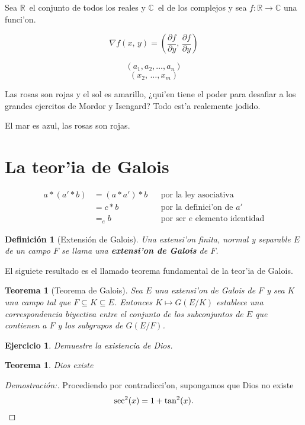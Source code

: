 \documentclass[11pt,titlepage]{article}
\newcommand{\tto}{\longrightarrow}
\newcommand{\R}{{\ensuremath{\mathbb{R}}}}
\newcommand{\C}{{\ensuremath{\mathbb{C}}}}
\newcommand{\parcial}[2]{\frac{\partial #1}{\partial #2}}
\newcommand{\upla}[2]{(#1_1,#1_2,\ldots,#1_{#2})}
\newcommand{\kupla}[3][k]{(#2_{#3},\,\ldots,#2_{#1})}
\theoremstyle{plain}
\newtheorem{teor}[prop]{Teorema}
\theoremstyle{defintion}
\newtheorem{defi}{Definici\'{o}n}[section]
\newtheorem{ejer}{Ejercicio}[section]
\theoremstyle{remark}
\begin{document}
Sea \R\ el conjunto de todos los reales y \C\ el de los complejos y sea $f:\R\tto\C$ una funci'on.

\[
\nabla f(x,\,y)=\left(\parcial{f}{y},\,\parcial{f}{y}\right)
\]

\[\upla{a}{n}\]
\[\kupla[m]{x}{2}\]
\par 
Las rosas son rojas y el sol es amarillo, ¿qui'en tiene el poder para desafiar a los grandes ejercitos de Mordor y Isengard? Todo est'a realemente jodido.
\par 
El mar es azul, las rosas son rojas.
\section{La teor'ia de Galois}
\begin{align*}
a*(a'*b) &= (a*a')*b & &\text{por la ley asociativa}\\
		 &= c*b & &\text{por la definici'on de $a'$}\\
		 &{=}_{e} b & &\text{por ser $e$ elemento identidad}
\end{align*}

\begin{defi}[Extensi\'{o}n de Galois]
Una extensi'on finita, normal y separable $E$ de un campo $F$ se llama una {\bf extensi'on de Galois} de $F$.
\end{defi}
\par El siguiete resultado es el llamado teorema fundamental de la teor'ia de Galois.
\begin{teor}[Teorema de Galois]
Sea $E$ una extensi'on de Galois de $F$ y sea $K$ una campo tal que $F\subseteq K\subseteq E$.
Entonces $K\mapsto G(E/K)$ establece una correspondencia biyectiva entre el conjunto de los subconjuntos de $E$ que contienen a $F$ y los subgrupos de $G(E/F)$.
\end{teor}

\begin{ejer}
Demuestre la existencia de Dios.
\end{ejer}

\begin{teor}
Dios existe
\end{teor}
\begin{proof}[Demostraci\'{o}n:]
Procediendo por contradicci'on, supongamos que Dios no existe
\[ \sec^2(x)=1+\tan^2(x). \qedhere \]

\end{proof}
\end{document}

